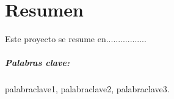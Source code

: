 \chapter{Resumen}

Este proyecto se resume en.................

\paragraph{Palabras clave:} palabraclave1, palabraclave2, palabraclave3.
